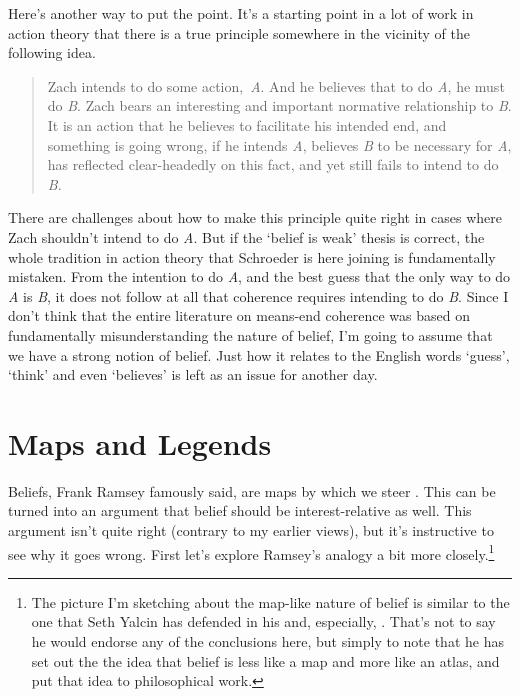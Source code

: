 \documentclass[
  11pt,
]{book}
\begin{document}
Here's another way to put the point. It's a starting point in a lot of work in action theory that there is a true principle somewhere in the vicinity of the following idea.

\begin{quote}
Zach intends to do some action,~\emph{A}. And he believes that to do \emph{A}, he must do \emph{B}. Zach bears an interesting and important normative relationship to \emph{B}. It is an action that he believes to facilitate his intended end, and something is going wrong, if he intends \emph{A}, believes \emph{B} to be necessary for \emph{A}, has reflected clear-headedly on this fact, and yet still fails to intend to do \emph{B}. \citep[ 223]{Schroeder2009}
\end{quote}

There are challenges about how to make this principle quite right in cases where Zach shouldn't intend to do \emph{A}. But if the `belief is weak' thesis is correct, the whole tradition in action theory that Schroeder is here joining is fundamentally mistaken. From the intention to do \emph{A}, and the best guess that the only way to do \emph{A} is \emph{B}, it does not follow at all that coherence requires intending to do \emph{B}. Since I don't think that the entire literature on means-end coherence was based on fundamentally misunderstanding the nature of belief, I'm going to assume that we have a strong notion of belief. Just how it relates to the English words `guess', `think' and even `believes' is left as an issue for another day.

\hypertarget{mapslegends}{%
\section{Maps and Legends}\label{mapslegends}}

Beliefs, Frank Ramsey famously said, are maps by which we steer \citep[146]{RamseyGeneralProp}. This can be turned into an argument that belief should be interest-relative as well. This argument isn't quite right (contrary to my earlier views), but it's instructive to see why it goes wrong. First let's explore Ramsey's analogy a bit more closely.\footnote{The picture I'm sketching about the map-like nature of belief is similar to the one that Seth Yalcin has defended in his \citeyearpar{Yalcin2018} and, especially, \citeyearpar{Yalcin2021}. That's not to say he would endorse any of the conclusions here, but simply to note that he has set out the the idea that belief is less like a map and more like an atlas, and put that idea to philosophical work.}
\end{document}
